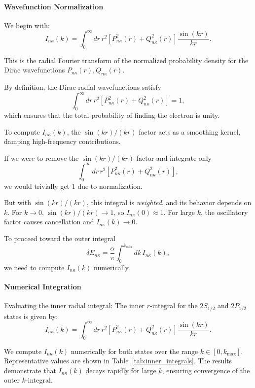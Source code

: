 \documentclass[12pt]{article}
\begin{document}
\paragraph{Wavefunction Normalization}
We begin with:
\[
I_{n\kappa}(k) = \int_0^\infty dr\, r^2 \left[P_{n\kappa}^2(r) + Q_{n\kappa}^2(r)\right] \frac{\sin(kr)}{kr}.
\]

This is the radial Fourier transform of the normalized probability density for the Dirac wavefunctions \( P_{n\kappa}(r), Q_{n\kappa}(r) \).

\medskip

By definition, the Dirac radial wavefunctions satisfy
\[
\int_0^\infty dr\, r^2 \left[P_{n\kappa}^2(r) + Q_{n\kappa}^2(r)\right] = 1,
\]
which ensures that the total probability of finding the electron is unity.

\medskip

To compute \( I_{n\kappa}(k) \), the \(\sin(kr)/(kr)\) factor acts as a smoothing kernel, damping high-frequency contributions.  

If we were to remove the \(\sin(kr)/(kr)\) factor and integrate only
\[
\int_0^\infty dr\, r^2 \left[P_{n\kappa}^2(r) + Q_{n\kappa}^2(r)\right],
\]
we would trivially get \(1\) due to normalization.

\medskip

But with \(\sin(kr)/(kr)\), this integral is \emph{weighted}, and its behavior depends on \(k\). For \(k \to 0\), \(\sin(kr)/(kr) \to 1\), so \(I_{n\kappa}(0) \approx 1\). For large \(k\), the oscillatory factor causes cancellation and \(I_{n\kappa}(k) \to 0\).

\medskip

To proceed toward the outer integral
\[
\delta E_{n\kappa} = \frac{\alpha}{\pi} \int_0^{k_\mathrm{max}} dk\, I_{n\kappa}(k),
\]
we need to compute \(I_{n\kappa}(k)\) numerically.


\paragraph{Numerical Integration}
Evaluating the inner radial integral:
\noindent
The inner $r$-integral for the $2S_{1/2}$ and $2P_{1/2}$ states is given by:
\begin{equation}
I_{n\kappa}(k) = \int_0^\infty dr \, r^2 \left[ P_{n\kappa}^2(r) + Q_{n\kappa}^2(r) \right] \frac{\sin(kr)}{kr}.
\end{equation}

We compute $I_{n\kappa}(k)$ numerically for both states over the range $k \in [0, k_{\mathrm{max}}]$. Representative values are shown in Table~\ref{tab:inner_integrals}. The results demonstrate that \(I_{n\kappa}(k)\) decays rapidly for large \(k\), ensuring convergence of the outer $k$-integral.
\end{document}
